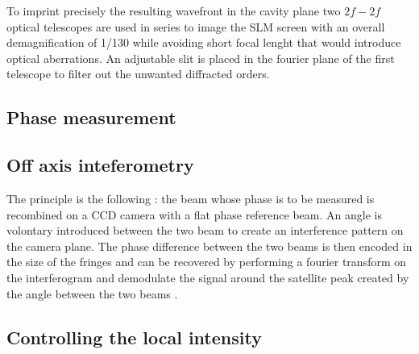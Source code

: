 To imprint precisely the resulting wavefront in the cavity plane two $2f-2f$ optical telescopes are used in series to image the SLM screen with an overall demagnification of 1/130 while avoiding short focal lenght that would introduce optical aberrations.
An adjustable slit is placed in the fourier plane of the first telescope to filter out the unwanted diffracted orders.

\subsection{Phase measurement}
\label{sec:phase_measurement}

\subsection{Off axis inteferometry}
The principle is the following :
the beam whose phase is to be measured is recombined on a CCD camera with a flat phase reference beam. An angle is volontary introduced between the two beam to create an interference pattern on the camera plane. The phase difference between 
the two beams is then encoded in the size of the fringes and can be recovered by performing a fourier transform on the interferogram and demodulate the signal around the satellite peak created by the angle between the two beams \cite{liebling_complex-wave_2004}.

\subsection{Controlling the local intensity}

\label{sec:local_intensity}
